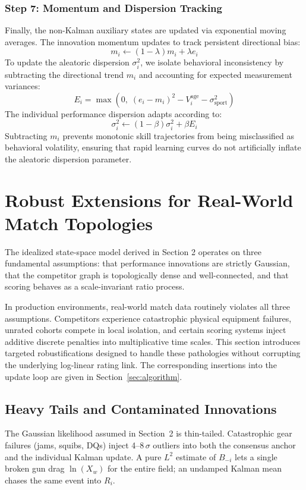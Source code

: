 \documentclass[12pt]{article}
\newcommand{\sigmai}{\sigma_i^2}
\newcommand{\ssport}{\sigma_{\mathrm{sport}}^2}      %
\newcommand{\betad}{\beta}      %
\newcommand{\lambdad}{\lambda}  %
\newcommand{\xwin}{X_w}
\begin{document}
	\subsubsection*{Step 7: Momentum and Dispersion Tracking}
	Finally, the non-Kalman auxiliary states are updated via exponential moving averages. The innovation momentum updates to track persistent directional bias:
	\begin{equation}
		m_i \leftarrow (1 - \lambdad) m_i + \lambdad e_i
	\end{equation}
	To update the aleatoric dispersion $\sigmai$, we isolate behavioral inconsistency by subtracting the directional trend $m_i$ and accounting for expected measurement variances:
	\begin{equation}
		E_i = \max\!\left(0,\; (e_i - m_i)^2 - V_i^{\mathrm{age}} - \ssport\right)
	\end{equation}
	The individual performance dispersion adapts according to:
	\begin{equation}
		\sigmai \leftarrow (1 - \betad)\sigmai + \betad E_i
	\end{equation}
	Subtracting $m_i$ prevents monotonic skill trajectories from being misclassified as behavioral volatility, ensuring that rapid learning curves do not artificially inflate the aleatoric dispersion parameter.
	
	\section{Robust Extensions for Real-World Match Topologies}
	\label{sec:robust}
	
	The idealized state-space model derived in Section 2 operates on three fundamental assumptions: that performance innovations are strictly Gaussian, that the competitor graph is topologically dense and well-connected, and that scoring behaves as a scale-invariant ratio process. 
	
	In production environments, real-world match data routinely violates all three assumptions. Competitors experience catastrophic physical equipment failures, unrated cohorts compete in local isolation, and certain scoring systems inject additive discrete penalties into multiplicative time scales. This section introduces targeted robustifications designed to handle these pathologies without corrupting the underlying log-linear rating link. The corresponding insertions into the update loop are given in Section~\ref{sec:algorithm}.
	
	\subsection{Heavy Tails and Contaminated Innovations}
	\label{sec:heavytails}
	The Gaussian likelihood assumed in Section~2 is thin-tailed. Catastrophic gear failures (jams, squibs, DQs) inject 4--8\,$\sigma$ outliers into both the consensus anchor and the individual Kalman update. A pure $L^2$ estimate of $B_{-i}$ lets a single broken gun drag $\ln(\xwin)$ for the entire field; an undamped Kalman mean chases the same event into $R_i$.
	
\end{document}

